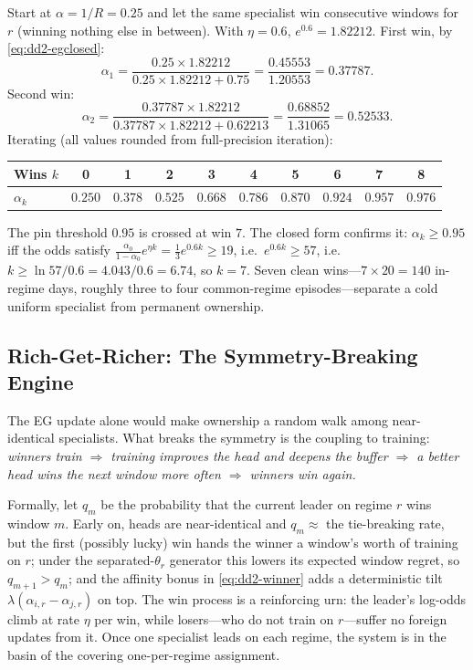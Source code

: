 \begin{example}
\label{ex:dd2-egtrace}
Start at $\alpha = 1/R = 0.25$ and let the same specialist win consecutive
windows for $r$ (winning nothing else in between). With $\eta = 0.6$,
$e^{0.6} = 1.82212$. First win, by \eqref{eq:dd2-egclosed}:
\[
\alpha_1 = \frac{0.25 \times 1.82212}{0.25 \times 1.82212 + 0.75}
= \frac{0.45553}{1.20553} = 0.37787.
\]
Second win:
\[
\alpha_2 = \frac{0.37787 \times 1.82212}{0.37787 \times 1.82212 + 0.62213}
= \frac{0.68852}{1.31065} = 0.52533.
\]
Iterating (all values rounded from full-precision iteration):

\begin{center}
\begin{tabular}{lccccccccc}
\toprule
Wins $k$ & 0 & 1 & 2 & 3 & 4 & 5 & 6 & 7 & 8 \\
\midrule
$\alpha_k$ & $0.250$ & $0.378$ & $0.525$ & $0.668$ & $0.786$ & $0.870$ & $0.924$ & $\mathbf{0.957}$ & $0.976$ \\
\bottomrule
\end{tabular}
\end{center}

The pin threshold $0.95$ is crossed at win $7$. The closed form confirms it:
$\alpha_k \ge 0.95$ iff the odds satisfy
$\tfrac{\alpha_0}{1-\alpha_0} e^{\eta k} = \tfrac13 e^{0.6k} \ge 19$, i.e.\
$e^{0.6k} \ge 57$, i.e.\ $k \ge \ln 57 / 0.6 = 4.043/0.6 = 6.74$, so
$k = 7$. Seven clean wins---$7 \times 20 = 140$ in-regime days, roughly three
to four common-regime episodes---separate a cold uniform specialist from
permanent ownership.
\end{example}

\subsection{Rich-Get-Richer: The Symmetry-Breaking Engine}

The EG update alone would make ownership a random walk among near-identical
specialists. What breaks the symmetry is the coupling to training:
\emph{winners train $\Rightarrow$ training improves the head and deepens the
buffer $\Rightarrow$ a better head wins the next window more often
$\Rightarrow$ winners win again.}

Formally, let $q_m$ be the probability that the current leader on regime $r$
wins window $m$. Early on, heads are near-identical and $q_m \approx$ the
tie-breaking rate, but the first (possibly lucky) win hands the winner a
window's worth of training on $r$; under the separated-$\theta_r$ generator
this lowers its expected window regret, so $q_{m+1} > q_m$; and the affinity
bonus in \eqref{eq:dd2-winner} adds a deterministic tilt
$\lambda(\alpha_{i,r} - \alpha_{j,r})$ on top. The win process is a
reinforcing urn: the leader's log-odds climb at rate $\eta$ per win, while
losers---who do not train on $r$---suffer no foreign updates from it. Once
one specialist leads on each regime, the system is in the basin of the
covering one-per-regime assignment.

